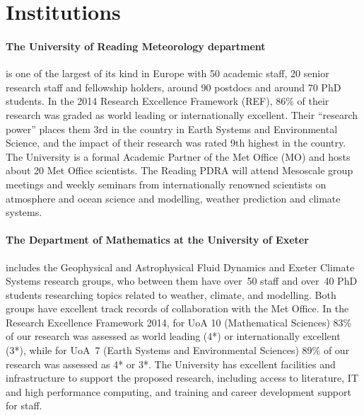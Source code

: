 \documentclass[11pt,a4paper]{article}
\begin{document}
\section*{Institutions}

\paragraph*{The University of Reading Meteorology department} is one of the largest of its kind in Europe with 50 academic staff, 20 senior research staff and fellowship holders, around 90 postdocs and around 70 PhD students. In the 2014 Research Excellence Framework (REF), 86\% of their research was graded as world leading or internationally excellent. Their ``research power'' places them 3rd in the country in Earth Systems and Environmental Science, and the impact of their research was rated 9th highest in the country. The University is a formal Academic Partner of the Met Office (MO) and hosts about 20 Met Office scientists. The Reading PDRA will attend Mesoscale group meetings and weekly seminars from internationally renowned scientists on atmosphere and ocean science and modelling, weather prediction and climate systems.

\paragraph*{The Department of Mathematics at the University of Exeter} includes the Geophysical and Astrophysical Fluid Dynamics and Exeter Climate Systems research groups, who between them have over~50 staff and over~40 PhD students researching topics related to weather, climate, and modelling. Both groups have excellent track records of collaboration with the Met Office. In the Research Excellence Framework 2014, for UoA 10 (Mathematical Sciences) 83\% of our research was assessed as world leading (4*) or internationally excellent (3*), while for UoA~7 (Earth Systems and Environmental Sciences) 89\% of our research was assessed as 4* or 3*.  The University has excellent facilities and infrastructure to support the proposed
research, including access to literature, IT and high performance computing,
and training and career development support for staff.
\end{document}

